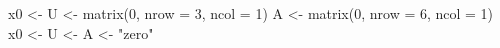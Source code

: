 \begin{Schunk}
\begin{Sinput}
 x0 <- U <- matrix(0, nrow = 3, ncol = 1)
 A <- matrix(0, nrow = 6, ncol = 1)
 x0 <- U <- A <- "zero"
\end{Sinput}
\end{Schunk}
